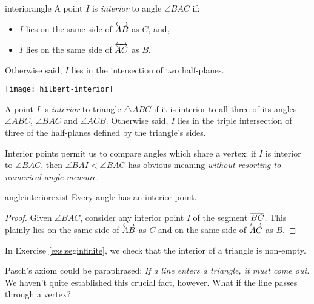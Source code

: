 \begin{defn}{}{interiorangle}
	A point $I$ is \emph{interior} to angle $\angle BAC$ if:\par
	\begin{minipage}[t]{0.6\linewidth}\vspace{0pt}
		\begin{itemize}\itemsep0pt
	  	\item $I$ lies on the same side of $\overleftrightarrow{AB}$ as $C$, and,
	  	\item $I$ lies on the same side of $\overleftrightarrow{AC}$ as $B$.
		\end{itemize}
		Otherwise said, $I$ lies in the intersection of two half-planes.
	\end{minipage}
	\hfill
	\begin{minipage}[t]{0.35\linewidth}\vspace{-20pt}
		\flushright
		\texttt{[image: hilbert-interior]}
	\end{minipage}\medbreak
	
	A point $I$ is \emph{interior} to triangle $\triangle ABC$ if it is interior to all three of its angles $\angle ABC$, $\angle BAC$ and $\angle ACB$. Otherwise said, $I$ lies in the triple intersection of three of the half-planes defined by the triangle's sides.
\end{defn}

Interior points permit us to compare angles which share a vertex: if $I$ is interior to $\angle BAC$, then $\angle BAI<\angle BAC$ has obvious meaning \emph{without resorting to numerical angle measure.}

\begin{cor}{}{angleinteriorexist}
	Every angle has an interior point.
\end{cor}

\begin{proof}
	Given $\angle BAC$, consider any interior point $I$ of the segment $\overline{BC}$. This plainly lies on the same side of $\overleftrightarrow{AB}$ as $C$ and on the same side of $\overleftrightarrow{AC}$ as $B$.
\end{proof}

In Exercise \ref{exs:seginfinite}, we check that the interior of a triangle is non-empty.
\vfil

\goodbreak

Pasch's axiom could be paraphrased: \emph{If a line enters a triangle, it must come out.} We haven't quite established this crucial fact, however. What if the line passes through a vertex?

